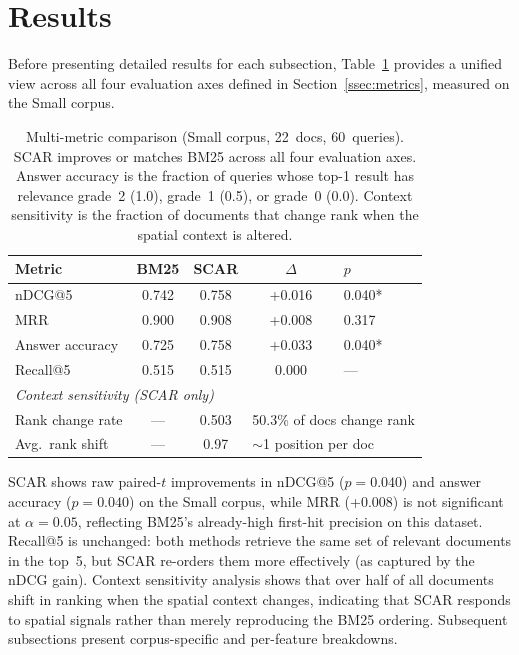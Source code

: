 \documentclass[journal]{IEEEtran}
\begin{document}
\section{Results}
\label{sec:results}

Before presenting detailed results for each subsection, Table~\ref{tab:multi_metric} provides a unified view across all four evaluation axes defined in Section~\ref{ssec:metrics}, measured on the Small corpus.

\begin{table}[htbp]
\centering
\caption{Multi-metric comparison (Small corpus, 22~docs, 60~queries). SCAR improves or matches BM25 across all four evaluation axes. Answer accuracy is the fraction of queries whose top-1 result has relevance grade~2 (1.0), grade~1 (0.5), or grade~0 (0.0). Context sensitivity is the fraction of documents that change rank when the spatial context is altered.}
\label{tab:multi_metric}
\begin{tabular}{lcccl}
\hline
\textbf{Metric} & \textbf{BM25} & \textbf{SCAR} & \textbf{$\Delta$} & \textbf{$p$} \\
\hline
nDCG@5              & 0.742 & 0.758 & +0.016 & 0.040* \\
MRR                 & 0.900 & 0.908 & +0.008 & 0.317 \\
Answer accuracy     & 0.725 & 0.758 & +0.033 & 0.040* \\
Recall@5            & 0.515 & 0.515 & 0.000  & --- \\
\hline
\multicolumn{5}{l}{\textit{Context sensitivity (SCAR only)}} \\
\hline
Rank change rate    & --- & 0.503 & \multicolumn{2}{l}{50.3\% of docs change rank} \\
Avg.\ rank shift   & --- & 0.97  & \multicolumn{2}{l}{$\sim$1 position per doc} \\
\hline
\end{tabular}
\end{table}

SCAR shows raw paired-$t$ improvements in nDCG@5 ($p = 0.040$) and answer accuracy ($p = 0.040$) on the Small corpus, while MRR (+0.008) is not significant at $\alpha = 0.05$, reflecting BM25's already-high first-hit precision on this dataset. Recall@5 is unchanged: both methods retrieve the same set of relevant documents in the top~5, but SCAR re-orders them more effectively (as captured by the nDCG gain). Context sensitivity analysis shows that over half of all documents shift in ranking when the spatial context changes, indicating that SCAR responds to spatial signals rather than merely reproducing the BM25 ordering. Subsequent subsections present corpus-specific and per-feature breakdowns.
\end{document}
